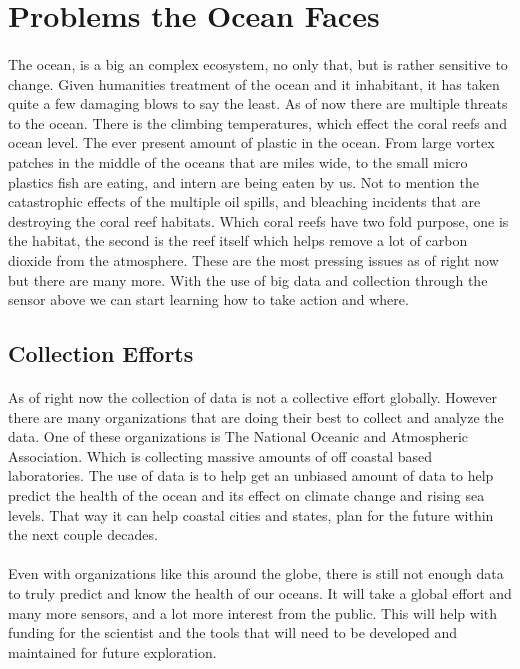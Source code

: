 \documentclass[sigconf]{acmart}
\begin{document}
\section{Problems the Ocean Faces}

\paragraph{}
The ocean, is a big an complex ecosystem, no only that, but is rather sensitive to change.  Given humanities treatment of the ocean and it inhabitant, it has taken quite a few damaging blows to say the least.  As of now there are multiple threats to the ocean.  There is the climbing temperatures, which effect the coral reefs and ocean level.  The ever present amount of plastic in the ocean.  From large vortex patches in the middle of the oceans that are miles wide, to the small micro plastics fish are eating, and intern are being eaten by us. Not to mention the catastrophic effects of the multiple oil spills, and bleaching incidents that are destroying the coral reef habitats.  Which coral reefs have two fold purpose, one is the habitat, the second is the reef itself which helps remove a lot of carbon dioxide from the atmosphere.  These are the most pressing issues as of right now but there are many more.  With the use of big data and collection through the sensor above we can start learning how to take action and where.

\subsection{Collection Efforts}

\paragraph{}
As of right now the collection of data is not a collective effort globally. \citep{Delgnrain}  However there are many organizations that are doing their best to collect and analyze the data.  One of these organizations is The National Oceanic and Atmospheric Association.  Which is collecting massive amounts of off coastal based laboratories.  The use of data is to help get an unbiased amount of data to help predict the health of the ocean and its effect on climate change and rising sea levels. That way it can help coastal cities and states, plan for the future within the next couple decades.

\paragraph{}
Even with organizations like this around the globe, there is still not enough data to truly predict and know the health of our oceans.  It will take a global effort and many more sensors, and a lot more interest from the public.  This will help with funding for the scientist and the tools that will need to be developed and maintained for future exploration. 
\end{document}
